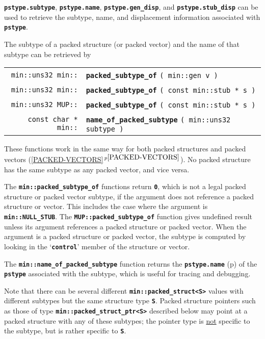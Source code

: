 \documentclass[12pt]{article}
\makeatletter
\newcommand{\TT}[1]{{\tt \bfseries #1}}
\newcommand{\ttindex}[1]{\index{#1@{\tt #1}}}
\newcommand{\itemref}[1]{\ref{#1}$\,^{p\pageref{#1}}$}
\newcommand{\pagref}[1]{p\pageref{#1}}
\newcommand{\EOL}{\penalty \exhyphenpenalty}
\newenvironment{indpar}[1][0.3in]%
	{\begin{list}{}%
		     {\setlength{\itemsep}{0in}%
		      \setlength{\topsep}{0in}%
		      \setlength{\parsep}{1ex}%
		      \setlength{\labelwidth}{#1}%
		      \setlength{\leftmargin}{#1}%
		      \addtolength{\leftmargin}{\labelsep}}%
	 \item}%
	{\end{list}}
\newcommand{\LABEL}[1]{\label{#1}}
\newcommand{\MINKEY}[1]%
	   {\TT{#1}\ttindex{min::#1}\ttindex{#1}}
\newcommand{\MUPKEY}[1]%
	   {\TT{#1}\ttindex{MUP::#1}\ttindex{#1}}
\makeatother
\begin{document}
\TT{pstype.subtype}, \TT{pstype.name},
\TT{pstype.gen\_\EOL disp},
and \TT{pstype.stub\_\EOL disp}
can be used to retrieve the subtype, name, and displacement
information associated with \TT{pstype}.

The subtype of a packed structure (or packed vector)
and the name of that subtype can be retrieved by

\begin{indpar}\begin{tabular}{r@{}l}
\verb|min::uns32 min::|
	& \MINKEY{packed\_subtype\_of} \verb|( min::gen v )|
\LABEL{MIN::PACKED_STRUCT_SUBTYPE_OF_GEN} \\
\verb|min::uns32 min::|
	& \MINKEY{packed\_subtype\_of} \verb|( const min::stub * s )|
\LABEL{MIN::PACKED_STRUCT_SUBTYPE_OF_STUB} \\
\verb|min::uns32 MUP::|
	& \MUPKEY{packed\_subtype\_of} \verb|( const min::stub * s )|
\LABEL{MUP::PACKED_STRUCT_SUBTYPE_OF_STUB} \\
\verb|const char * min::|
	& \MINKEY{name\_of\_packed\_subtype} \verb|( min::uns32 subtype )|
\LABEL{MIN::NAME_OF_PACKED_SUBTYPE} \\
\end{tabular}\end{indpar}

These functions work in the same way for both packed structures
and packed vectors (\itemref{PACKED-VECTORS}).
No packed structure has the same subtype as any packed vector, and
vice versa.

The \TT{min::\EOL packed\_\EOL subtype\_\EOL of}
functions return \TT{0}, which
is not a legal packed structure or packed vector subtype, if the
argument does not reference a packed structure or vector.  This includes
the case where the argument is \TT{min::\EOL NULL\_\EOL STUB}.
The \TT{MUP::\EOL packed\_\EOL subtype\_\EOL of} function gives
undefined result unless its argument references a packed structure
or packed vector.  When the argument is a packed structure
or packed vector,
the subtype is computed by looking in the
`\TT{control}' member of the structure or vector.

The \TT{min::name\_of\_packed\_subtype} function returns the
\TT{pstype.name} (\pagref{NAME_IN_PACKED_STRUCT}) of the
\TT{pstype} associated
with the subtype, which is useful for tracing and debugging.

Note that there can be several different
\TT{min::\EOL packed\_\EOL struct<S>}
values with different subtypes but the same structure
type \TT{S}.  Packed structure pointers such as those of type
\TT{min::\EOL packed\_\EOL struct\_\EOL ptr<S>}
described below may point at a packed structure with any of these subtypes;
the pointer type is \underline{not} specific to the subtype, but
is rather specific to \TT{S}.
\end{document}
